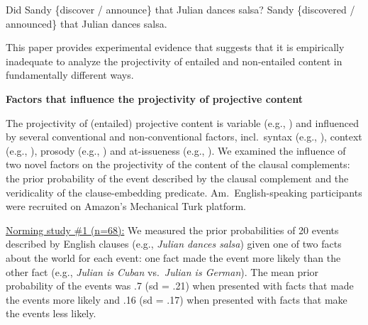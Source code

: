 \documentclass[12pt,fleqn]{article}
\newcommand{\6}{\mbox{$[\hspace*{-.6mm}[$}}
\newcommand{\9}{\mbox{$]\hspace*{-.6mm}]$}}
\begin{document}
\vspace*{-.2cm}
\begin{exe}
\ex
\begin{xlist}
\ex\label{embedded} Did Sandy \{discover / announce\} that Julian dances salsa?
\ex\label{unembedded} Sandy \{discovered / announced\} that Julian dances salsa.
\end{xlist}
\end{exe}
\vspace*{-.2cm}

This paper provides experimental evidence that suggests that it is empirically inadequate to analyze the projectivity of entailed and non-entailed content in fundamentally different ways. 

{\bf Factors that influence the projectivity of projective content}

The projectivity of (entailed) projective content is variable (e.g., \citealt{karttunen71b,kadmon01,tbd-variability}) and influenced by several conventional and non-conventional factors, incl.\ syntax (e.g., \citealt{potts05}), context (e.g., \citealt{beaver-belly}), prosody (e.g., \citealt{cummins-rohde2015,tonhauser-salt26}) and at-issueness (e.g., \citealt{tbd-variability}). We examined the influence of two novel factors on the projectivity of the content of the clausal complements: the prior probability of the event described by the clausal complement and the veridicality of the clause-embedding predicate. Am.\ English-speaking participants were recruited on Amazon's Mechanical Turk platform.

\vspace*{.7ex}

\underline{Norming study \#1 (n=68):} We measured the prior probabilities of 20 events described by English clauses (e.g., {\em Julian dances salsa}) given one of two facts about the world for each event: one fact made the event more likely than the other fact (e.g., {\em Julian is Cuban} vs.\ {\em Julian is German}). The mean prior probability of the events was .7 (sd = .21) when presented with facts that made the events more likely and .16 (sd = .17) when presented with facts that make the events less likely.

\vspace*{.7ex}
\end{document}
